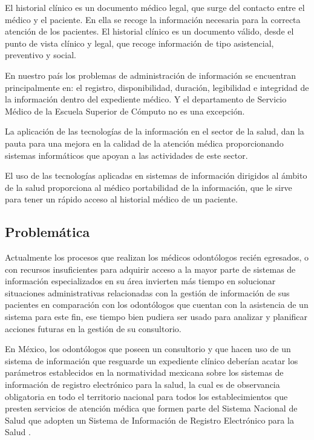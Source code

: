 \vspace{1em}

El historial clínico es un documento médico legal, que surge del contacto entre el médico y el paciente. En ella se recoge la información necesaria para la correcta atención de los pacientes. El historial clínico es un documento válido, desde el punto de vista clínico y legal, que recoge información de tipo asistencial,
preventivo y social.

\vspace{1em}

En nuestro país los problemas de administración de información se encuentran principalmente en: el registro, disponibilidad, duración, legibilidad e integridad de la información dentro del expediente médico. Y el departamento de Servicio Médico de la Escuela Superior de Cómputo no es una excepción. 

\vspace{1em}

La aplicación de las tecnologías de la información en el sector de la salud, dan la pauta para una mejora en la calidad de la atención médica proporcionando sistemas informáticos que apoyan a las actividades de este
sector.

\vspace{1em}

El uso de las tecnologías aplicadas en sistemas de información dirigidos al ámbito de la salud proporciona al médico portabilidad de la información, que le sirve para tener un rápido acceso al historial médico de un paciente.
\fi

\subsection{Problemática}

Actualmente los procesos que realizan los médicos odontólogos recién egresados, o con recursos insuficientes para adquirir acceso a la mayor parte de sistemas de información especializados en su área invierten más tiempo en solucionar situaciones administrativas relacionadas con la gestión de información de sus pacientes en comparación con los odontólogos que cuentan con la asistencia de un sistema para este fin, ese tiempo bien pudiera ser usado para analizar y planificar acciones futuras en la gestión de su consultorio. 

\vspace{1em}

En México, los odontólogos que poseen un consultorio y que hacen uso de un sistema de información que resguarde un expediente clínico deberían acatar los parámetros establecidos en la normatividad mexicana sobre los sistemas de información de registro electrónico para la salud, la cual es de observancia obligatoria en todo el territorio nacional para todos los establecimientos que presten servicios de atención médica que formen parte del Sistema Nacional de Salud que adopten un Sistema de Información de Registro Electrónico para la Salud \cite{A02}. 

